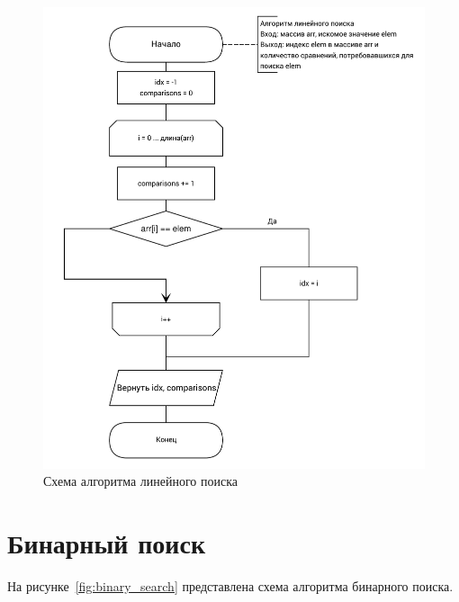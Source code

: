 \begin{figure}[!htb]
\centering
\includegraphics[width=\textwidth]{inc/img/linear_search.pdf}
\caption{Схема алгоритма линейного поиска}
\label{fig:linear_search}
\end{figure}

\section{Бинарный поиск}

На рисунке~\ref{fig:binary_search} представлена схема алгоритма бинарного поиска.

